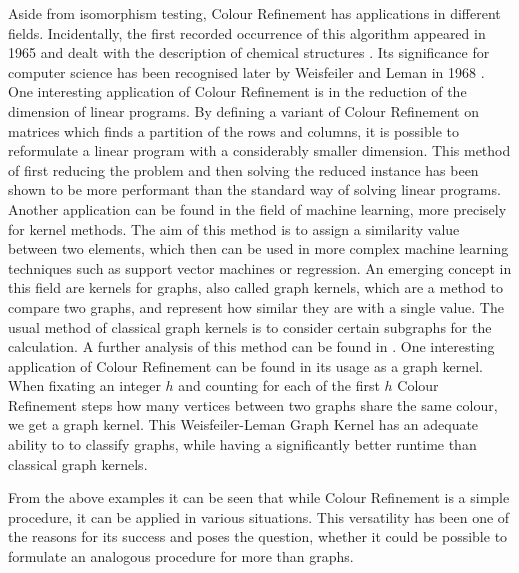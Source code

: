Aside from isomorphism testing, Colour Refinement has applications in different fields.
Incidentally, the first recorded occurrence of this algorithm appeared in 1965 and dealt with the description of chemical structures \cite{morgan1965GenerationUnique}.
Its significance for computer science has been recognised later by Weisfeiler and Leman in 1968 \cite{weisfeiler1968reduction}.
One interesting application of Colour Refinement is in the reduction of the dimension of linear programs.
By defining a variant of Colour Refinement on matrices which finds a partition of the rows and columns, it is possible to reformulate a linear program with a considerably smaller dimension. 
This method of first reducing the problem and then solving the reduced instance has been shown to be more performant than the standard way of solving linear programs. \cite{grohe2014DimensionReduction}
Another application can be found in the field of machine learning, more precisely for kernel methods.
The aim of this method is to assign a similarity value between two elements, which then can be used in more complex machine learning techniques such as support vector machines or regression.
An emerging concept in this field are kernels for graphs, also called graph kernels, which are a method to compare two graphs, and represent how similar they are with a single value.
The usual method of classical graph kernels is to consider certain subgraphs for the calculation.
A further analysis of this method can be found in \cite{vishwanathan2010graph}.
One interesting application of Colour Refinement can be found in its usage as a graph kernel.
When fixating an integer $h$ and counting for each of the first $h$ Colour Refinement steps how many vertices between two graphs share the same colour, we get a graph kernel.
This Weisfeiler-Leman Graph Kernel has an adequate ability to to classify graphs, while having a significantly better runtime than classical graph kernels. \cite{grohe2021ColorRefinement}

From the above examples it can be seen that while Colour Refinement is a simple procedure, it can be applied in various situations.
This versatility has been one of the reasons for its success and poses the question, whether it could be possible to formulate an analogous procedure for more than graphs.




